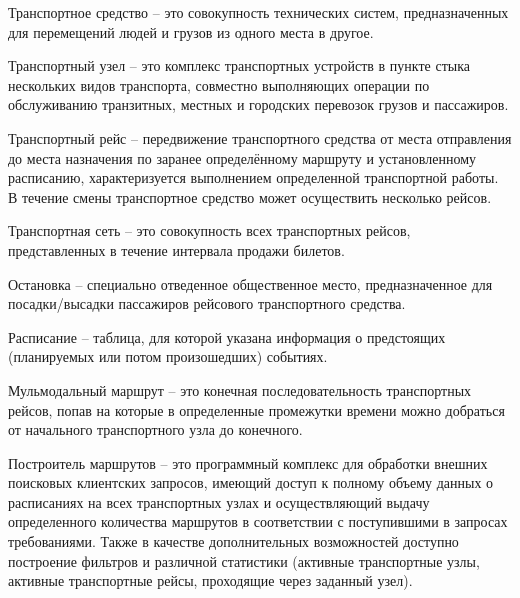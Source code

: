 \begin{definition}
Транспортное средство -- это совокупность технических систем, предназначенных для перемещений людей и грузов из одного места в другое.
\end{definition}

\begin{definition}
Транспортный узел -- это комплекс транспортных устройств в пункте стыка нескольких видов транспорта, совместно выполняющих операции по обслуживанию транзитных, местных и городских перевозок грузов и пассажиров.
\end{definition}

\begin{definition}
Транспортный рейс -- передвижение транспортного средства от места отправления до места назначения по заранее определённому маршруту и установленному расписанию, характеризуется выполнением определенной транспортной работы. В течение смены транспортное средство может осуществить несколько рейсов.
\end{definition}

\begin{definition}
Транспортная сеть -- это совокупность всех транспортных рейсов, представленных в течение интервала продажи билетов.
\end{definition}

\begin{definition}
Остановка -- специально отведенное общественное место, предназначенное для посадки/высадки пассажиров рейсового транспортного средства.
\end{definition}

\begin{definition}
Расписание -- таблица, для которой указана информация о предстоящих (планируемых или потом произошедших) событиях.
\end{definition}

\begin{definition}
Мульмодальный маршрут -- это конечная последовательность транспортных рейсов, попав на которые в определенные промежутки времени можно добраться от начального транспортного узла до конечного.
\end{definition}

\begin{definition}
Построитель маршрутов -- это программный комплекс для обработки внешних поисковых клиентских запросов, имеющий доступ к полному объему данных о расписаниях на всех транспортных узлах и осуществляющий выдачу определенного количества маршрутов в соответствии с поступившими в запросах требованиями. Также в качестве дополнительных возможностей доступно построение фильтров и различной статистики (активные транспортные узлы, активные транспортные рейсы, проходящие через заданный узел).
\end{definition}

